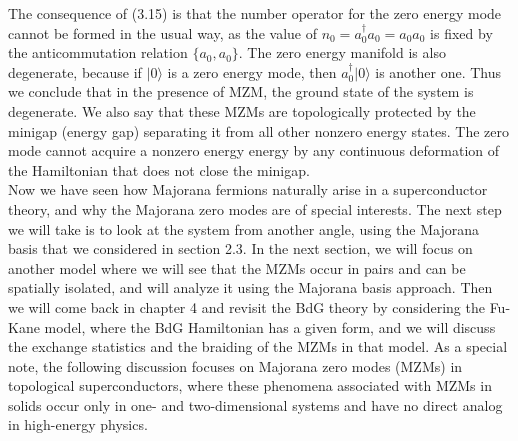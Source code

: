 \documentclass[11pt, oneside]{book}
\theoremstyle{break}
\theoremstyle{break}
\begin{document}
The consequence of (3.15) is that the number operator for the zero energy mode cannot be formed in the usual way, as the value of $n_0 = a^\dagger_0 a_0 = a_0 a_0$ is fixed by the anticommutation relation $\{a_0, a_0\}$. The zero energy manifold is also degenerate, because if $|0\rangle$ is a zero energy mode, then $a^\dagger_0|0\rangle$ is another one. Thus we conclude that in the presence of MZM, the ground state of the system is degenerate. We also say that these MZMs are topologically protected by the minigap (energy gap) separating it from all other nonzero energy states. The zero mode cannot acquire a nonzero energy energy by any continuous deformation of the Hamiltonian that does not close the minigap. \\

Now we have seen how Majorana fermions naturally arise in a superconductor theory, and why the Majorana zero modes are of special interests. The next step we will take is to look at the system from another angle, using the Majorana basis that we considered in section 2.3. In the next section, we will focus on another model where we will see that the MZMs occur in pairs and can be spatially isolated, and will analyze it using the Majorana basis approach. Then we will come back in chapter 4 and revisit the BdG theory by considering the Fu-Kane model, where the BdG Hamiltonian has a given form, and we will discuss the exchange statistics and the braiding of the MZMs in that model. As a special note, the following discussion focuses on Majorana zero modes (MZMs) in topological superconductors, where these phenomena associated with MZMs in solids occur only in one- and two-dimensional systems and have no direct analog in high-energy physics.\\





\end{document}
